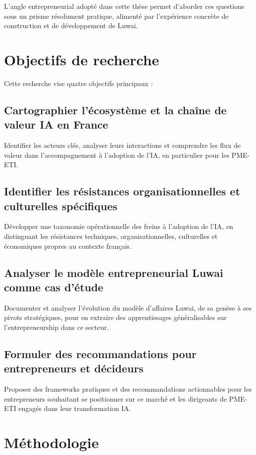\documentclass[12pt,a4paper]{report}
\begin{document}
L'angle entrepreneurial adopté dans cette thèse permet d'aborder ces questions sous un prisme résolument pratique, alimenté par l'expérience concrète de construction et de développement de Luwai.

\section{Objectifs de recherche}

Cette recherche vise quatre objectifs principaux :

\subsection{Cartographier l'écosystème et la chaîne de valeur IA en France}
Identifier les acteurs clés, analyser leurs interactions et comprendre les flux de valeur dans l'accompagnement à l'adoption de l'IA, en particulier pour les PME-ETI.

\subsection{Identifier les résistances organisationnelles et culturelles spécifiques}
Développer une taxonomie opérationnelle des freins à l'adoption de l'IA, en distinguant les résistances techniques, organisationnelles, culturelles et économiques propres au contexte français.

\subsection{Analyser le modèle entrepreneurial Luwai comme cas d'étude}
Documenter et analyser l'évolution du modèle d'affaires Luwai, de sa genèse à ses pivots stratégiques, pour en extraire des apprentissages généralisables sur l'entrepreneurship dans ce secteur.

\subsection{Formuler des recommandations pour entrepreneurs et décideurs}
Proposer des frameworks pratiques et des recommandations actionnables pour les entrepreneurs souhaitant se positionner sur ce marché et les dirigeants de PME-ETI engagés dans leur transformation IA.

\section{Méthodologie}
\end{document}

